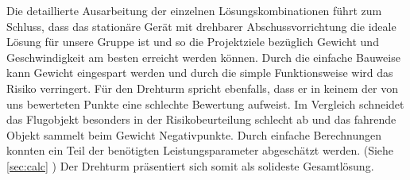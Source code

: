 Die detaillierte Ausarbeitung der einzelnen Lösungskombinationen führt
zum Schluss, dass das stationäre Gerät mit drehbarer 
Abschussvorrichtung die ideale Lösung für unsere Gruppe ist und so die 
Projektziele bezüglich Gewicht und Geschwindigkeit am besten erreicht werden können. 
Durch die einfache Bauweise kann Gewicht eingespart werden und durch die simple 
Funktionsweise wird das Risiko verringert. Für den Drehturm spricht ebenfalls, 
dass er in keinem der von uns bewerteten Punkte eine schlechte Bewertung aufweist.
Im Vergleich schneidet das Flugobjekt besonders in der Risikobeurteilung schlecht ab 
und das fahrende Objekt sammelt beim Gewicht Negativpunkte. Durch einfache 
Berechnungen konnten ein Teil der benötigten Leistungsparameter abgeschätzt 
werden. (Siehe \autoref{sec:calc} )
Der Drehturm präsentiert sich somit als solideste Gesamtlösung.

